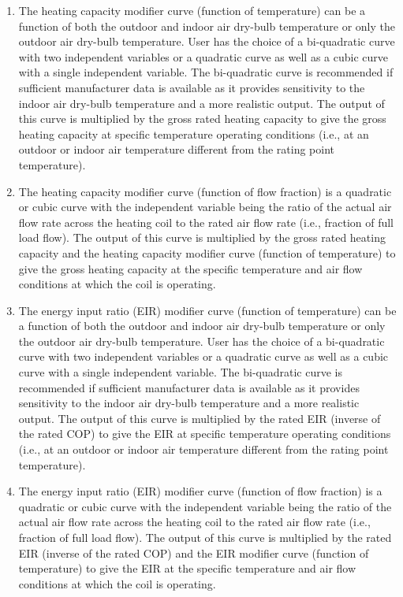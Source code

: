 \begin{enumerate}
\def\labelenumi{\arabic{enumi})}
\item
  The heating capacity modifier curve (function of temperature) can be a function of both the outdoor and indoor air dry-bulb temperature or only the outdoor air dry-bulb temperature. User has the choice of a bi-quadratic curve with two independent variables or a quadratic curve as well as a cubic curve with a single independent variable. The bi-quadratic curve is recommended if sufficient manufacturer data is available as it provides sensitivity to the indoor air dry-bulb temperature and a more realistic output. The output of this curve is multiplied by the gross rated heating capacity to give the gross heating capacity at specific temperature operating conditions (i.e., at an outdoor or indoor air temperature different from the rating point temperature).
\item
  The heating capacity modifier curve (function of flow fraction) is a quadratic or cubic curve with the independent variable being the ratio of the actual air flow rate across the heating coil to the rated air flow rate (i.e., fraction of full load flow). The output of this curve is multiplied by the gross rated heating capacity and the heating capacity modifier curve (function of temperature) to give the gross heating capacity at the specific temperature and air flow conditions at which the coil is operating.
\item
  The energy input ratio (EIR) modifier curve (function of temperature) can be a function of both the outdoor and indoor air dry-bulb temperature or only the outdoor air dry-bulb temperature. User has the choice of a bi-quadratic curve with two independent variables or a quadratic curve as well as a cubic curve with a single independent variable. The bi-quadratic curve is recommended if sufficient manufacturer data is available as it provides sensitivity to the indoor air dry-bulb temperature and a more realistic output. The output of this curve is multiplied by the rated EIR (inverse of the rated COP) to give the EIR at specific temperature operating conditions (i.e., at an outdoor or indoor air temperature different from the rating point temperature).
\item
  The energy input ratio (EIR) modifier curve (function of flow fraction) is a quadratic or cubic curve with the independent variable being the ratio of the actual air flow rate across the heating coil to the rated air flow rate (i.e., fraction of full load flow). The output of this curve is multiplied by the rated EIR (inverse of the rated COP) and the EIR modifier curve (function of temperature) to give the EIR at the specific temperature and air flow conditions at which the coil is operating.

\end{enumerate}
